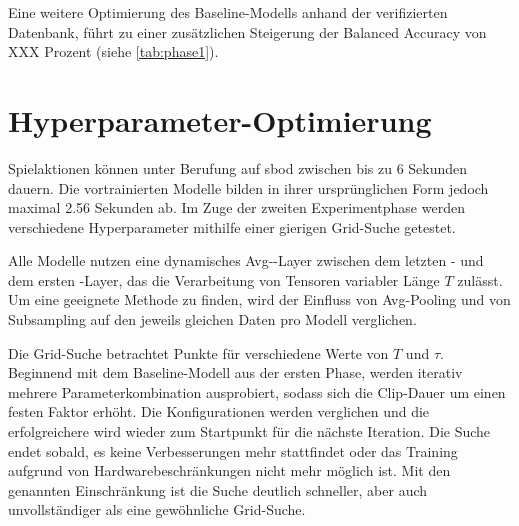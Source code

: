 Eine weitere Optimierung des Baseline-Modells anhand der verifizierten Datenbank, führt zu einer zusätzlichen Steigerung der Balanced Accuracy von XXX Prozent (siehe \autoref{tab:phase1}).

\section{Hyperparameter-Optimierung}
\label{sec:hyperparameter-optimierung}

Spielaktionen können unter Berufung auf \gls{sbod} zwischen bis zu 6 Sekunden dauern.
Die vortrainierten Modelle bilden in ihrer ursprünglichen Form jedoch maximal 2.56 Sekunden ab.
Im Zuge der zweiten Experimentphase werden verschiedene Hyperparameter mithilfe einer gierigen Grid-Suche getestet.

Alle Modelle nutzen eine dynamisches Avg-\pool-Layer zwischen dem letzten \conv- und dem ersten \fc-Layer, das die Verarbeitung von Tensoren variabler Länge $T$ zulässt.
Um eine geeignete Methode zu finden, wird der Einfluss von Avg-Pooling und von Subsampling auf den jeweils gleichen Daten pro Modell verglichen.

Die Grid-Suche betrachtet Punkte für verschiedene Werte von $T$ und $\tau$.
Beginnend mit dem Baseline-Modell aus der ersten Phase, werden iterativ mehrere Parameterkombination ausprobiert, sodass sich die Clip-Dauer um einen festen Faktor erhöht.
Die Konfigurationen werden verglichen und die erfolgreichere wird wieder zum Startpunkt für die nächste Iteration.
Die Suche endet sobald, es keine Verbesserungen mehr stattfindet oder das Training aufgrund von Hardwarebeschränkungen nicht mehr möglich ist.
Mit den genannten Einschränkung ist die Suche deutlich schneller, aber auch unvollständiger als eine gewöhnliche Grid-Suche.

